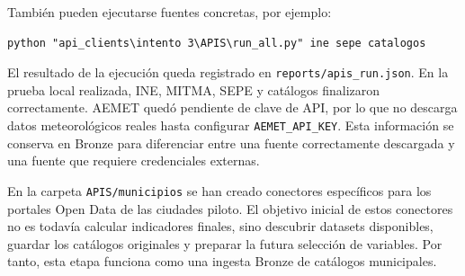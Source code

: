 También pueden ejecutarse fuentes concretas, por ejemplo:

\begin{verbatim}
python "api_clients\intento 3\APIS\run_all.py" ine sepe catalogos
\end{verbatim}

El resultado de la ejecución queda registrado en \texttt{reports/apis\_run.json}. En la prueba local realizada, INE, MITMA, SEPE y catálogos finalizaron correctamente. AEMET quedó pendiente de clave de API, por lo que no descarga datos meteorológicos reales hasta configurar \texttt{AEMET\_API\_KEY}. Esta información se conserva en Bronze para diferenciar entre una fuente correctamente descargada y una fuente que requiere credenciales externas.

En la carpeta \texttt{APIS/municipios} se han creado conectores específicos para los portales Open Data de las ciudades piloto. El objetivo inicial de estos conectores no es todavía calcular indicadores finales, sino descubrir datasets disponibles, guardar los catálogos originales y preparar la futura selección de variables. Por tanto, esta etapa funciona como una ingesta Bronze de catálogos municipales.

